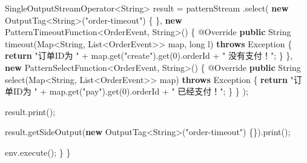 \documentclass[cn,11pt,chinese]{elegantbook}
\newenvironment{Shaded}{}{}
\newcommand{\AttributeTok}[1]{\textcolor[rgb]{0.49,0.56,0.16}{#1}}
\newcommand{\BuiltInTok}[1]{#1}
\newcommand{\DataTypeTok}[1]{\textcolor[rgb]{0.56,0.13,0.00}{#1}}
\newcommand{\DecValTok}[1]{\textcolor[rgb]{0.25,0.63,0.44}{#1}}
\newcommand{\FunctionTok}[1]{\textcolor[rgb]{0.02,0.16,0.49}{#1}}
\newcommand{\KeywordTok}[1]{\textcolor[rgb]{0.00,0.44,0.13}{\textbf{#1}}}
\newcommand{\NormalTok}[1]{#1}
\newcommand{\StringTok}[1]{\textcolor[rgb]{0.25,0.44,0.63}{#1}}
\begin{document}
\begin{Shaded}
\begin{Highlighting}[]
\NormalTok{        SingleOutputStreamOperator\textless{}}\BuiltInTok{String}\NormalTok{\textgreater{} result = patternStream}
\NormalTok{            .}\FunctionTok{select}\NormalTok{(}
                \KeywordTok{new}\NormalTok{ OutputTag\textless{}}\BuiltInTok{String}\NormalTok{\textgreater{}(}\StringTok{"order{-}timeout"}\NormalTok{) \{}
\NormalTok{                \},}
                \KeywordTok{new}\NormalTok{ PatternTimeoutFunction\textless{}OrderEvent, }\BuiltInTok{String}\NormalTok{\textgreater{}() \{}
                    \AttributeTok{@Override}
                    \KeywordTok{public} \BuiltInTok{String} \FunctionTok{timeout}\NormalTok{(}\BuiltInTok{Map}\NormalTok{\textless{}}\BuiltInTok{String}\NormalTok{, }\BuiltInTok{List}\NormalTok{\textless{}OrderEvent\textgreater{}\textgreater{} map, }\DataTypeTok{long}\NormalTok{ l) }\KeywordTok{throws} \BuiltInTok{Exception}\NormalTok{ \{}
                        \KeywordTok{return} \StringTok{"订单ID为 "}\NormalTok{ + map.}\FunctionTok{get}\NormalTok{(}\StringTok{"create"}\NormalTok{).}\FunctionTok{get}\NormalTok{(}\DecValTok{0}\NormalTok{).}\FunctionTok{orderId}\NormalTok{ + }\StringTok{" 没有支付！"}\NormalTok{;}
\NormalTok{                    \}}
\NormalTok{                \},}
                \KeywordTok{new}\NormalTok{ PatternSelectFunction\textless{}OrderEvent, }\BuiltInTok{String}\NormalTok{\textgreater{}() \{}
                    \AttributeTok{@Override}
                    \KeywordTok{public} \BuiltInTok{String} \FunctionTok{select}\NormalTok{(}\BuiltInTok{Map}\NormalTok{\textless{}}\BuiltInTok{String}\NormalTok{, }\BuiltInTok{List}\NormalTok{\textless{}OrderEvent\textgreater{}\textgreater{} map) }\KeywordTok{throws} \BuiltInTok{Exception}\NormalTok{ \{}
                        \KeywordTok{return} \StringTok{"订单ID为 "}\NormalTok{ + map.}\FunctionTok{get}\NormalTok{(}\StringTok{"pay"}\NormalTok{).}\FunctionTok{get}\NormalTok{(}\DecValTok{0}\NormalTok{).}\FunctionTok{orderId}\NormalTok{ + }\StringTok{" 已经支付！"}\NormalTok{;}
\NormalTok{                    \}}
\NormalTok{                \}}
\NormalTok{            );}

\NormalTok{        result.}\FunctionTok{print}\NormalTok{();}

\NormalTok{        result.}\FunctionTok{getSideOutput}\NormalTok{(}\KeywordTok{new}\NormalTok{ OutputTag\textless{}}\BuiltInTok{String}\NormalTok{\textgreater{}(}\StringTok{"order{-}timeout"}\NormalTok{) \{\}).}\FunctionTok{print}\NormalTok{();}

\NormalTok{        env.}\FunctionTok{execute}\NormalTok{();}
\NormalTok{    \}}
\NormalTok{\}}
\end{Highlighting}
\end{Shaded}
\end{document}
